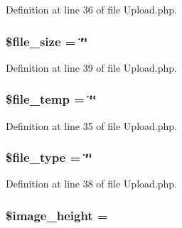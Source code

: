 Definition at line 36 of file Upload.\+php.

\subsubsection[{\texorpdfstring{\$file\+\_\+size}{$file_size}}]{\setlength{\rightskip}{0pt plus 5cm}\$file\+\_\+size = \char`\"{}\char`\"{}}\hypertarget{class_c_i___upload_a5b3595a69dbf686d879bd009ec9c0317}{}\label{class_c_i___upload_a5b3595a69dbf686d879bd009ec9c0317}


Definition at line 39 of file Upload.\+php.

\subsubsection[{\texorpdfstring{\$file\+\_\+temp}{$file_temp}}]{\setlength{\rightskip}{0pt plus 5cm}\$file\+\_\+temp = \char`\"{}\char`\"{}}\hypertarget{class_c_i___upload_a8b49917820e40f0b8956d95c1fd6ee6e}{}\label{class_c_i___upload_a8b49917820e40f0b8956d95c1fd6ee6e}


Definition at line 35 of file Upload.\+php.

\subsubsection[{\texorpdfstring{\$file\+\_\+type}{$file_type}}]{\setlength{\rightskip}{0pt plus 5cm}\$file\+\_\+type = \char`\"{}\char`\"{}}\hypertarget{class_c_i___upload_a6210dfa92a7e2e5e9db1aa2337ce4cd1}{}\label{class_c_i___upload_a6210dfa92a7e2e5e9db1aa2337ce4cd1}


Definition at line 38 of file Upload.\+php.

\subsubsection[{\texorpdfstring{\$image\+\_\+height}{$image_height}}]{\setlength{\rightskip}{0pt plus 5cm}\$image\+\_\+height = \textquotesingle{}\textquotesingle{}}\hypertarget{class_c_i___upload_af1b0485025a4c66fa3b2fc442df02d72}{}\label{class_c_i___upload_af1b0485025a4c66fa3b2fc442df02d72}


